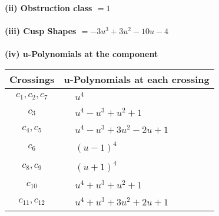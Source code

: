\documentclass[1p]{elsarticle_modified}
\theoremstyle{definition}
\begin{document}
\flushleft \textbf{(ii) Obstruction class $= 1$}\\~\\
\flushleft \textbf{(iii) Cusp Shapes $= -3 u^3+3 u^2-10 u-4$}\\~\\
\newpage\renewcommand{\arraystretch}{1}
\flushleft \textbf{(iv) u-Polynomials at the component}\newline \\
\begin{tabular}{m{50pt}|m{274pt}}
Crossings & \hspace{64pt}u-Polynomials at each crossing \\
\hline $$\begin{aligned}c_{1},c_{2},c_{7}\end{aligned}$$&$\begin{aligned}
&u^4
\end{aligned}$\\
\hline $$\begin{aligned}c_{3}\end{aligned}$$&$\begin{aligned}
&u^4- u^3+u^2+1
\end{aligned}$\\
\hline $$\begin{aligned}c_{4},c_{5}\end{aligned}$$&$\begin{aligned}
&u^4- u^3+3 u^2-2 u+1
\end{aligned}$\\
\hline $$\begin{aligned}c_{6}\end{aligned}$$&$\begin{aligned}
&(u-1)^4
\end{aligned}$\\
\hline $$\begin{aligned}c_{8},c_{9}\end{aligned}$$&$\begin{aligned}
&(u+1)^4
\end{aligned}$\\
\hline $$\begin{aligned}c_{10}\end{aligned}$$&$\begin{aligned}
&u^4+u^3+u^2+1
\end{aligned}$\\
\hline $$\begin{aligned}c_{11},c_{12}\end{aligned}$$&$\begin{aligned}
&u^4+u^3+3 u^2+2 u+1
\end{aligned}$\\
\hline
\end{tabular}\\~\\
\end{document}
